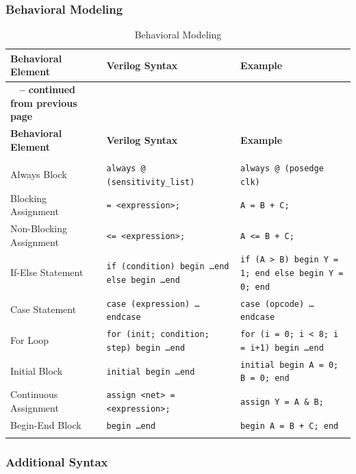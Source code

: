 \documentclass[12pt]{journal}
\begin{document}
\subsubsection{Behavioral Modeling}
\begin{longtable}{|>{\centering\arraybackslash}m{4cm}|>{\centering\arraybackslash}m{6cm}|>{\centering\arraybackslash}m{4cm}|}
\hline
\textbf{Behavioral Element} & \textbf{Verilog Syntax} & \textbf{Example} \\ 
\hline
\endfirsthead
\multicolumn{3}{c}%
{{\bfseries \tablename\ \thetable{} -- continued from previous page}} \\
\hline
\textbf{Behavioral Element} & \textbf{Verilog Syntax} & \textbf{Example} \\ 
\hline
\endhead
\hline \multicolumn{3}{|c|}{{\textbf{Continued on next page}}} \\ \hline
\endfoot
\hline
\endlastfoot

Always Block & \texttt{always @ (sensitivity\_list)} & \texttt{always @ (posedge clk)} \\ 
\hline
Blocking Assignment & \texttt{= <expression>;} & \texttt{A = B + C;} \\ 
\hline
Non-Blocking Assignment & \texttt{<= <expression>;} & \texttt{A <= B + C;} \\ 
\hline
If-Else Statement & \texttt{if (condition) begin \dots end else begin \dots end} & \texttt{if (A > B) begin Y = 1; end else begin Y = 0; end} \\
\hline
Case Statement & \texttt{case (expression) \dots endcase} & \texttt{case (opcode) \dots endcase} \\
\hline
For Loop & \texttt{for (init; condition; step) begin \dots end} & \texttt{for (i = 0; i < 8; i = i+1) begin \dots end} \\
\hline
Initial Block & \texttt{initial begin \dots end} & \texttt{initial begin A = 0; B = 0; end} \\ 
\hline
Continuous Assignment & \texttt{assign <net> = <expression>;} & \texttt{assign Y = A \& B;} \\
\hline
Begin-End Block & \texttt{begin \dots end} & \texttt{begin A = B + C; end} \\
\hline
\caption{Behavioral Modeling}
\label{tab:behavioral}
\end{longtable}

\subsubsection{Additional Syntax}
\end{document}
